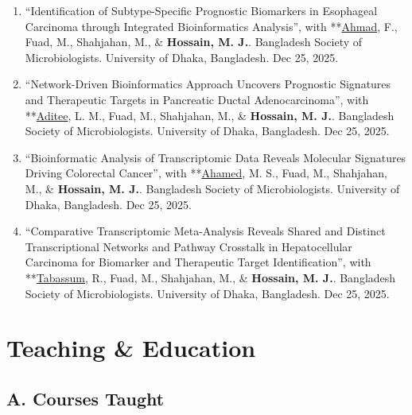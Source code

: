 \documentclass[
  11pt,
  letterpaper,
  DIV=11,
  numbers=noendperiod]{scrartcl}
\providecommand{\tightlist}{%
  \setlength{\itemsep}{0pt}\setlength{\parskip}{0pt}}
\begin{document}
\begin{enumerate}
\def\labelenumi{\arabic{enumi}.}
\tightlist
\item
  ``Identification of Subtype-Specific Prognostic Biomarkers in
  Esophageal Carcinoma through Integrated Bioinformatics Analysis'',
  with **\underline{Ahmad}, F., Fuad, M., Shahjahan, M., \&
  \textbf{Hossain, M. J.}. Bangladesh Society of Microbiologists.
  University of Dhaka, Bangladesh. Dec 25, 2025.
\item
  ``Network-Driven Bioinformatics Approach Uncovers Prognostic
  Signatures and Therapeutic Targets in Pancreatic Ductal
  Adenocarcinoma'', with **\underline{Aditee}, L. M., Fuad, M.,
  Shahjahan, M., \& \textbf{Hossain, M. J.}. Bangladesh Society of
  Microbiologists. University of Dhaka, Bangladesh. Dec 25, 2025.
\item
  ``Bioinformatic Analysis of Transcriptomic Data Reveals Molecular
  Signatures Driving Colorectal Cancer'', with **\underline{Ahamed}, M.
  S., Fuad, M., Shahjahan, M., \& \textbf{Hossain, M. J.}. Bangladesh
  Society of Microbiologists. University of Dhaka, Bangladesh. Dec 25,
  2025.
\item
  ``Comparative Transcriptomic Meta-Analysis Reveals Shared and Distinct
  Transcriptional Networks and Pathway Crosstalk in Hepatocellular
  Carcinoma for Biomarker and Therapeutic Target Identification'', with
  **\underline{Tabassum}, R., Fuad, M., Shahjahan, M., \&
  \textbf{Hossain, M. J.}. Bangladesh Society of Microbiologists.
  University of Dhaka, Bangladesh. Dec 25, 2025.
\end{enumerate}

\section{Teaching \& Education}\label{teaching-education}

\subsection{A. Courses Taught}\label{a.-courses-taught}
\end{document}
